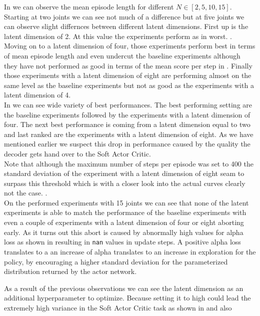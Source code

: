 In  we can observe the mean episode length for different $N \in [2, 5, 10, 15]$. Starting at two joints we can see not much of a difference but at five joints we can observe slight differnces between different latent dimensions. First up is the latent dimension of 2. At this value the experiments perform as in  worst. .\\
Moving on to a latent dimension of four, those experiments perform best in terms of mean episode length and even undercut the baseline experiments although they have not performed as good in terms of the mean score per step in . Finally those experiments with a latent dimension of eight are performing almost on the same level as the baseline experiments but not as good as the experiments with a latent dimension of 4. \\
In  we can see wide variety of best performances. The best performing setting are the baseline experiments followed by the experiments with a latent dimension of four. The next best performance is coming from a latent dimension equal to two and last ranked are the experiments with a latent dimension of eight. As we have mentioned earlier we suspect this drop in performance caused by the quality the decoder gets hand over to the Soft Actor Critic. \\
Note that although the maximum number of steps per episode was set to 400 the standard deviation of the experiment with a latent dimension of eight seam to surpass this threshold which is with a closer look into the actual curves clearly not the case. . \\ 
On the performed experiments with 15 joints we can see that none of the latent experiments is able to match the performance of the baseline experiments with even a couple of experiments with a latent dimension of four or eight aborting early. As it turns out this abort is caused by abnormally high values for alpha loss as shown in  resulting in \texttt{nan} values in update steps. A positive alpha loss translates to a an increase of alpha translates to an increase in exploration for the policy, by encouraging a higher standard deviation for the parameterized distribution returned by the actor network. 

As a result of the previous observations we can see the latent dimension as an additional hyperparameter to optimize. Because setting it to high could lead the extremely high variance in the Soft Actor Critic task as shown in  and also

